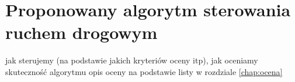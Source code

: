 \chapter{Proponowany algorytm sterowania ruchem drogowym}
jak sterujemy (na podstawie jakich kryteriów oceny itp), jak oceniamy skuteczność algorytmu
opis oceny na podstawie listy w rozdziale \ref{chap:ocena}